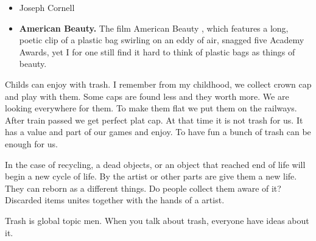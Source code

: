 \documentclass[12pt]{article}
\begin{document}
\begin{itemize}

\item Joseph Cornell

\item \textbf{American Beauty.} The film American Beauty , which features a long, poetic clip of a plastic bag swirling on an eddy of air, snagged five Academy Awards, yet I for one still find it hard to think of plastic bags as things of beauty. 

\end{itemize}

Childs can enjoy with trash. I remember from my childhood, we collect crown cap and play with them. Some caps are found less and they worth more. We are looking everywhere for them. To make them flat we put them on the railways. After train passed we get perfect plat cap. At that time it is not trash for us. It has a value and part of our games and enjoy. To have fun a bunch of trash can be enough for us.

In the case of recycling, a dead objects, or an object that reached end of life will begin a new cycle of life. By the artist or other parts are give them a new life. They can reborn as a different things. Do people collect them aware of it? Discarded items unites together with the hands of a artist. 

Trash is global topic men. When you talk about trash, everyone have ideas about it. 
\end{document}
